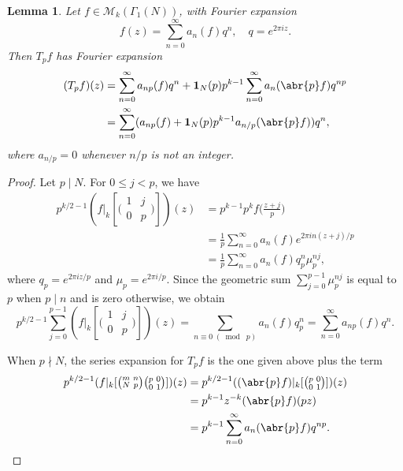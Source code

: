 \documentclass[10pt,leqno,twoside]{article}
\theoremstyle{plain}
\newtheorem{lemma}[lem]{Lemma}
\theoremstyle{definition}
\numberwithin{equation}{section}
\numberwithin{lem}{section}
\newcommand{\smod}[1]{\;(\bmod\; #1)}
\begin{document}
\begin{lemma}\label{lem: Fourier coefficients after Tp-ing}
    Let $f\in \mathcal M_k(\varGamma_1(N))$, with Fourier expansion 
    \[f(z) = \sum_{n=0}^\infty a_n(f)q^n,\quad q = e^{2\pi i z}.\] 
    Then $T_pf$ has Fourier expansion
    \begin{align*}
        (T_pf)(z) &= \sum_{n=0}^\infty a_{np}(f)q^n + \mathbf{1}_N(p)p^{k-1}\sum_{n=0}^\infty a_n(\abr{p}f)q^{np}\\
        &= \sum_{n=0}^\infty (a_{np}(f) + \mathbf{1}_N(p)p^{k-1}a_{n/p}(\abr{p}f))q^n,
    \end{align*}
    where $a_{n/p} = 0$ whenever $n/p$ is not an integer.
\end{lemma}
\begin{proof}
    Let $p\mid N$. For $0\leq j<p$, we have
    \begin{align*}
        p^{k/2-1}(f|_k[\big(\!\begin{smallmatrix}
            1 & j \\ 0 & p
        \end{smallmatrix}\!\big)])(z) &= p^{k-1}p^kf\bigg(\frac{z+j}{p}\bigg)\\
        &= \frac{1}{p}\sum_{n=0}^\infty a_n(f)e^{2\pi i n(z+j)/p}\\
        &= \frac{1}{p}\sum_{n=0}^\infty a_n(f)q_p^n\mu_p^{nj},
    \end{align*}
    where $q_p = e^{2\pi i z/p}$ and $\mu_p = e^{2\pi i/p}$. Since the geometric sum $\sum_{j=0}^{p-1} \mu_p^{nj}$ is equal to $p$ when $p\mid n$ and is zero otherwise, we obtain
    \[p^{k/2-1}\sum_{j=0}^{p-1}(f|_k[\big(\!\begin{smallmatrix}
        1 & j \\ 0 & p
    \end{smallmatrix}\!\big)])(z) = \sum_{n\equiv 0\smod p}a_n(f)q_p^n = \sum_{n=0}^\infty a_{np}(f)q^n.\]

    When $p\nmid N$, the series expansion for $T_pf$ is the one given above plus the term 
    \begin{align*}
        p^{k/2-1}(f|_k[\big(\!\begin{smallmatrix}
            m & n \\ N & p
        \end{smallmatrix}\!\big)\big(\!\begin{smallmatrix}
            p & 0 \\ 0 & 1
        \end{smallmatrix}\!\big)])(z) &= p^{k/2-1}((\abr{p}f)|_k[\big(\!\begin{smallmatrix}
            p & 0 \\ 0 & 1
        \end{smallmatrix}\!\big)])(z)\\
        &= p^{k-1}z^{-k}(\abr{p}f)(pz)\\
        &= p^{k-1}\sum_{n=0}^\infty a_n(\abr{p}f)q^{np}.\qedhere
    \end{align*}
\end{proof}
\end{document}
